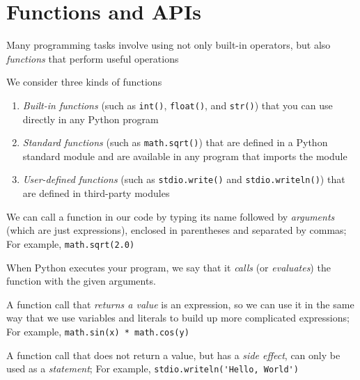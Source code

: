 \documentclass[8pt,a4paper,compress]{beamer}
\begin{document}
\section{Functions and APIs}
\begin{frame}[fragile]
Many programming tasks involve using not only built-in operators, but also \emph{functions} that perform useful operations

\bigskip

We consider three kinds of functions
\begin{enumerate}
\item \emph{Built-in functions} (such as \lstinline{int()}, \lstinline{float()}, and \lstinline{str()}) that you can use directly in any Python program

\item \emph{Standard functions} (such as \lstinline{math.sqrt()}) that are defined in a Python standard module and are available in any program that imports the module

\item \emph{User-defined functions} (such as \lstinline{stdio.write()} and \lstinline{stdio.writeln()}) that are defined in third-party modules
\end{enumerate}

\bigskip

We can call a function in our code by typing its name followed by \emph{arguments} (which are just expressions), enclosed in parentheses and separated by commas; For example, \lstinline{math.sqrt(2.0)}

\bigskip

When Python executes your program, we say that it \emph{calls} (or \emph{evaluates}) the function with the given arguments.

\bigskip

A function call that \emph{returns a value} is an expression, so we can use it in the same way that we use variables and literals to build up more complicated expressions; For example, \lstinline{math.sin(x) * math.cos(y)}

\bigskip

A function call that does not return a value, but has a \emph{side effect}, can only be used as a \emph{statement}; For example, \lstinline{stdio.writeln('Hello, World')}
\end{frame}
\end{document}
